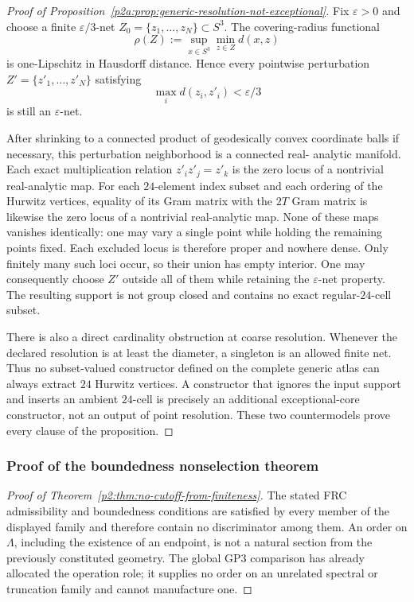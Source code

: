 \documentclass[11pt,a4paper]{article}
\begin{document}
\begin{proof}[Proof of Proposition~\ref{p2a:prop:generic-resolution-not-exceptional}]
Fix \(\varepsilon>0\) and choose a finite \(\varepsilon/3\)-net
\(Z_0=\{z_1,\ldots,z_N\}\subset S^3\).  The covering-radius functional
\[
 \rho(Z):=\sup_{x\in S^3}\min_{z\in Z}d(x,z)
\]
is one-Lipschitz in Hausdorff distance.  Hence every pointwise perturbation
\(Z'=\{z'_1,\ldots,z'_N\}\) satisfying
\[
 \max_i d(z_i,z'_i)<\varepsilon/3
\]
is still an \(\varepsilon\)-net.

After shrinking to a connected product of geodesically convex coordinate
balls if necessary, this perturbation neighborhood is a connected real-
analytic manifold.  Each exact multiplication relation
\(z'_iz'_j=z'_k\) is the zero locus of a nontrivial real-analytic map.  For each
\(24\)-element index subset and each ordering of the Hurwitz vertices, equality
of its Gram matrix with the \(2T\) Gram matrix is likewise the zero locus of
a nontrivial real-analytic map.  None of these maps vanishes identically:
one may vary a single point while holding the remaining points fixed.  Each
excluded locus is therefore proper and nowhere dense.  Only finitely many
such loci occur, so their union has empty interior.  One may consequently
choose \(Z'\) outside all of them while retaining the \(\varepsilon\)-net
property.  The resulting support is not group closed and contains no exact
regular-\(24\)-cell subset.

There is also a direct cardinality obstruction at coarse resolution.  Whenever
the declared resolution is at least the diameter, a singleton is an allowed
finite net.  Thus no subset-valued constructor defined on the complete generic
atlas can always extract \(24\) Hurwitz vertices.  A constructor that ignores
the input support and inserts an ambient \(24\)-cell is precisely an additional
exceptional-core constructor, not an output of point resolution.  These two
countermodels prove every clause of the proposition.
\end{proof}

\subsubsection{Proof of the boundedness nonselection theorem}
\begin{proof}[Proof of Theorem~\ref{p2:thm:no-cutoff-from-finiteness}]
The stated FRC admissibility and boundedness conditions are satisfied by every
member of the displayed family and therefore contain no discriminator among
them.  An order on
\(\Lambda\), including the existence of an endpoint, is not a natural section
from the previously constituted geometry.  The global GP3 comparison has
already allocated the operation role; it supplies no order on an unrelated
spectral or truncation family and cannot manufacture one.
\end{proof}
\end{document}
